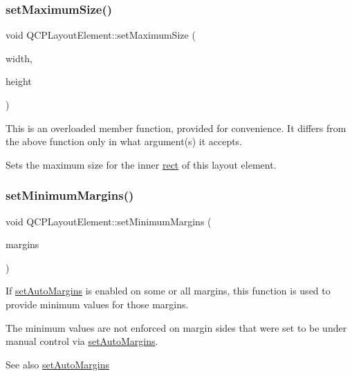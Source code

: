 \subsubsection{\texorpdfstring{set\+Maximum\+Size()}{setMaximumSize()}\hspace{0.1cm}{\footnotesize\ttfamily [2/2]}}
{\footnotesize\ttfamily void Q\+C\+P\+Layout\+Element\+::set\+Maximum\+Size (\begin{DoxyParamCaption}\item[{int}]{width,  }\item[{int}]{height }\end{DoxyParamCaption})}

This is an overloaded member function, provided for convenience. It differs from the above function only in what argument(s) it accepts.

Sets the maximum size for the inner \mbox{\hyperlink{class_q_c_p_layout_element_a208effccfe2cca4a0eaf9393e60f2dd4}{rect}} of this layout element. \mbox{\label{class_q_c_p_layout_element_a0a8a17abc16b7923159fcc7608f94673}} 
\subsubsection{\texorpdfstring{set\+Minimum\+Margins()}{setMinimumMargins()}}
{\footnotesize\ttfamily void Q\+C\+P\+Layout\+Element\+::set\+Minimum\+Margins (\begin{DoxyParamCaption}\item[{const Q\+Margins \&}]{margins }\end{DoxyParamCaption})}

If \mbox{\hyperlink{class_q_c_p_layout_element_accfda49994e3e6d51ed14504abf9d27d}{set\+Auto\+Margins}} is enabled on some or all margins, this function is used to provide minimum values for those margins.

The minimum values are not enforced on margin sides that were set to be under manual control via \mbox{\hyperlink{class_q_c_p_layout_element_accfda49994e3e6d51ed14504abf9d27d}{set\+Auto\+Margins}}.

\begin{DoxySeeAlso}{See also}
\mbox{\hyperlink{class_q_c_p_layout_element_accfda49994e3e6d51ed14504abf9d27d}{set\+Auto\+Margins}} 
\end{DoxySeeAlso}
\mbox{\label{class_q_c_p_layout_element_a5dd29a3c8bc88440c97c06b67be7886b}} 
